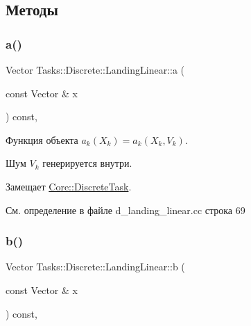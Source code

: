 \subsection{Методы}
\hypertarget{class_tasks_1_1_discrete_1_1_landing_linear_af0c0c48603fc226055ee233f93fa21fc}{}\label{class_tasks_1_1_discrete_1_1_landing_linear_af0c0c48603fc226055ee233f93fa21fc} 
\subsubsection{\texorpdfstring{a()}{a()}}
{\footnotesize\ttfamily Vector Tasks\+::\+Discrete\+::\+Landing\+Linear\+::a (\begin{DoxyParamCaption}\item[{const Vector \&}]{x }\end{DoxyParamCaption}) const\hspace{0.3cm}{\ttfamily [override]}, {\ttfamily [virtual]}}



Функция объекта $a_k(X_k) = a_k(X_k, V_k)$. 

Шум $V_k$ генерируется внутри. 

Замещает \hyperlink{class_core_1_1_discrete_task_a49d377fa365d5ec3e05962ee751f2d9e}{Core\+::\+Discrete\+Task}.



См. определение в файле d\+\_\+landing\+\_\+linear.\+cc строка 69

\hypertarget{class_tasks_1_1_discrete_1_1_landing_linear_a599d3491da6d84ba68c43433235e9980}{}\label{class_tasks_1_1_discrete_1_1_landing_linear_a599d3491da6d84ba68c43433235e9980} 
\subsubsection{\texorpdfstring{b()}{b()}}
{\footnotesize\ttfamily Vector Tasks\+::\+Discrete\+::\+Landing\+Linear\+::b (\begin{DoxyParamCaption}\item[{const Vector \&}]{x }\end{DoxyParamCaption}) const\hspace{0.3cm}{\ttfamily [override]}, {\ttfamily [virtual]}}



